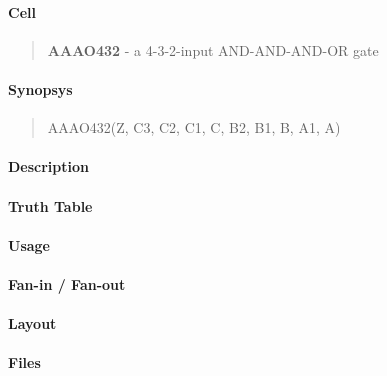 \label{AAAO432}
\paragraph{Cell}
\begin{quote}
    \textbf{AAAO432} - a 4-3-2-input AND-AND-AND-OR gate
\end{quote}

\paragraph{Synopsys}
\begin{quote}
    AAAO432(Z, C3, C2, C1, C, B2, B1, B, A1, A)
\end{quote}

\paragraph{Description}

%

\paragraph{Truth Table}
%

\paragraph{Usage}

\paragraph{Fan-in / Fan-out}

\paragraph{Layout}

\paragraph{Files}

